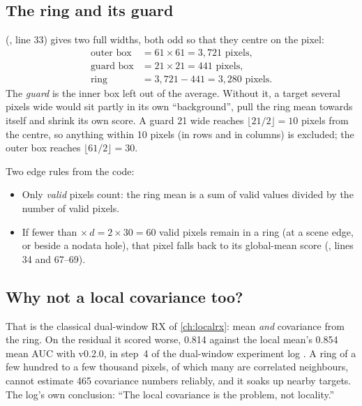 \subsection{The ring and its guard}

 (, line 33) gives two full widths, both odd so
that they centre on the pixel:
\begin{align*}
\text{outer box} &= 61\times61 = 3{,}721 \text{ pixels},\\
\text{guard box} &= 21\times21 = 441 \text{ pixels},\\
\text{ring} &= 3{,}721-441 = 3{,}280 \text{ pixels}.
\end{align*}
The \emph{guard} is the inner box left out of the average. Without it, a target several
pixels wide would sit partly in its own ``background'', pull the ring mean towards itself and shrink its own
score. A guard 21 wide reaches $\lfloor21/2\rfloor=10$ pixels from the centre, so anything within 10 pixels
(in rows and in columns) is excluded; the outer box reaches $\lfloor61/2\rfloor=30$.

Two edge rules from the code:
\begin{itemize}
\item Only \emph{valid} pixels count: the ring mean is a sum of valid values divided by the number of valid
  pixels.
\item If fewer than  $\times\, d=2\times30=60$ valid pixels remain in a ring (at a scene
  edge, or beside a nodata hole), that pixel falls back to its global-mean score
  (, lines 34 and 67--69).
\end{itemize}


\subsection{Why not a local covariance too?}

That is the classical dual-window RX of \cref{ch:localrx}: mean \emph{and} covariance from the ring. On the
residual it scored worse, 0.814 against the local mean's 0.854 mean AUC with v0.2.0, in step~4 of the
dual-window experiment log .
A ring of a few hundred to a few thousand pixels, of which many are correlated neighbours, cannot estimate 465
covariance numbers reliably, and it soaks up nearby targets. The log's own conclusion: ``The local
covariance is the problem, not locality.''


